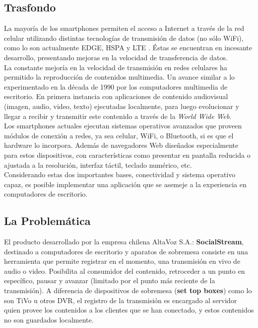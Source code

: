 \subsection{Trasfondo}
La mayoría de los smartphones permiten el acceso a Internet a través de la red celular utilizando distintas tecnologías de transmisión de datos (no sólo WiFi), como lo son actualmente EDGE, HSPA y LTE \cite{cap1:tecnologias-celulares}. Éstas se encuentran en incesante desarrollo, presentando mejoras en la velocidad de transferencia de datos.\\

La constante mejoría en la velocidad de transmisión en redes celulares ha permitido la reproducción de contenidos multimedia. Un avance similar a lo experimentado en la década de 1990 por los computadores multimedia de escritorio. En primera instancia con aplicaciones de contenido audiovisual (imagen, audio, video, texto) ejecutadas localmente, para luego evolucionar y llegar a recibir y transmitir este contenido a través de la \textit{World Wide Web}.\\

Los smartphones actuales ejecutan sistemas operativos avanzados que proveen módulos de conexión  a redes, ya sea celular, WiFi, o Bluetooth, si es que el hardware lo incorpora. Además de navegadores Web diseñados especialmente para estos dispositivos, con características como presentar en pantalla reducida o ajustada a la resolución, interfaz táctil, teclado numérico, etc.\\

Considerando estas dos importantes bases, conectividad y sistema operativo capaz, es posible implementar una aplicación que se asemeje a la experiencia en computadores de escritorio.

\subsection{La Problemática}
El producto desarrollado por la empresa chilena AltaVoz S.A.: \textbf{SocialStream}, destinado a computadores de escritorio y aparatos de sobremesa consiste en una herramienta que permite registrar en el momento, una transmisión en vivo de audio o video. Posibilita al consumidor del contenido, retroceder a un punto en específico, pausar  y avanzar (limitado por el punto más reciente de la transmisión). 
A diferencia de dispositivos de sobremesa (\textbf{set top boxes}) como lo son TiVo u otros DVR, el registro de la transmisión es encargado al servidor quien provee los contenidos a los clientes que se han conectado, y estos contenidos no son guardados localmente. \\


